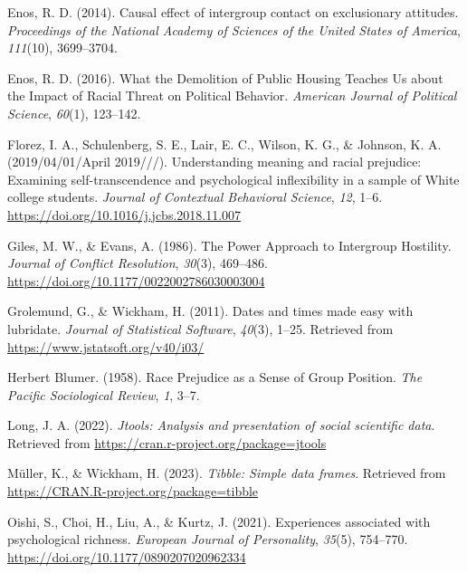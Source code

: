 \documentclass[
  man]{apa6}
\newlength{\cslhangindent}
\newlength{\cslentryspacingunit} %
\newenvironment{CSLReferences}[2] %
 {%
  \setlength{\parindent}{0pt}
  \ifodd #1
  \let\oldpar\par
  \def\par{\hangindent=\cslhangindent\oldpar}
  \fi
  \setlength{\parskip}{#2\cslentryspacingunit}
 }%
 {}
\begin{document}
\begin{CSLReferences}{1}{0}
\leavevmode{}%
Enos, R. D. (2014). Causal effect of intergroup contact on exclusionary attitudes. \emph{Proceedings of the National Academy of Sciences of the United States of America}, \emph{111}(10), 3699--3704.

\leavevmode{}%
Enos, R. D. (2016). What the {Demolition} of {Public Housing Teaches Us} about the {Impact} of {Racial Threat} on {Political Behavior}. \emph{American Journal of Political Science}, \emph{60}(1), 123--142.

\leavevmode{}%
Florez, I. A., Schulenberg, S. E., Lair, E. C., Wilson, K. G., \& Johnson, K. A. (2019/04/01/April 2019///). Understanding meaning and racial prejudice: {Examining} self-transcendence and psychological inflexibility in a sample of {White} college students. \emph{Journal of Contextual Behavioral Science}, \emph{12}, 1--6. \url{https://doi.org/10.1016/j.jcbs.2018.11.007}

\leavevmode{}%
Giles, M. W., \& Evans, A. (1986). The {Power Approach} to {Intergroup Hostility}. \emph{Journal of Conflict Resolution}, \emph{30}(3), 469--486. \url{https://doi.org/10.1177/0022002786030003004}

\leavevmode{}%
Grolemund, G., \& Wickham, H. (2011). Dates and times made easy with {lubridate}. \emph{Journal of Statistical Software}, \emph{40}(3), 1--25. Retrieved from \url{https://www.jstatsoft.org/v40/i03/}

\leavevmode{}%
Herbert Blumer. (1958). Race {Prejudice} as a {Sense} of {Group Position}. \emph{The Pacific Sociological Review}, \emph{1}, 3--7.

\leavevmode{}%
Long, J. A. (2022). \emph{Jtools: Analysis and presentation of social scientific data}. Retrieved from \url{https://cran.r-project.org/package=jtools}

\leavevmode{}%
Müller, K., \& Wickham, H. (2023). \emph{Tibble: Simple data frames}. Retrieved from \url{https://CRAN.R-project.org/package=tibble}

\leavevmode{}%
Oishi, S., Choi, H., Liu, A., \& Kurtz, J. (2021). Experiences associated with psychological richness. \emph{European Journal of Personality}, \emph{35}(5), 754--770. \url{https://doi.org/10.1177/0890207020962334}


\end{CSLReferences}
\end{document}
